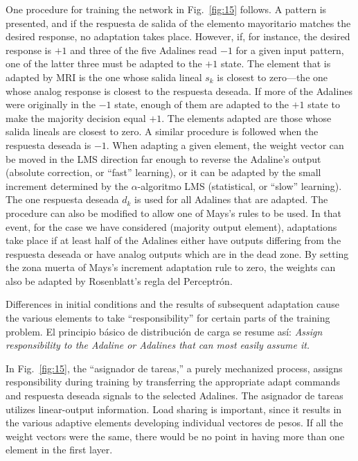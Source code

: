 \documentclass[10pt,twocolumn]{article}
\begin{document}
One procedure for training the network in Fig.~\ref{fig:15} follows. A pattern is
presented, and if the respuesta de salida of the elemento mayoritario matches the desired
response, no adaptation takes place. However, if, for instance, the desired
response is $+1$ and three of the five Adalines read $-1$ for a given input
pattern, one of the latter three must be adapted to the $+1$ state. The element
that is adapted by MRI is the one whose salida lineal $s_k$ is closest to
zero---the one whose analog response is closest to the respuesta deseada. If more
of the Adalines were originally in the $-1$ state, enough of them are adapted to
the $+1$ state to make the majority decision equal $+1$. The elements adapted are
those whose salida lineals are closest to zero. A similar procedure is followed
when the respuesta deseada is $-1$. When adapting a given element, the weight
vector can be moved in the LMS direction far enough to reverse the Adaline's
output (absolute correction, or ``fast'' learning), or it can be adapted by the
small increment determined by the $\alpha$-algoritmo LMS (statistical, or ``slow''
learning). The one respuesta deseada $d_k$ is used for all Adalines that are
adapted. The procedure can also be modified to allow one of Mays's rules to be
used. In that event, for the case we have considered (majority output element),
adaptations take place if at least half of the Adalines either have outputs
differing from the respuesta deseada or have analog outputs which are in the dead
zone. By setting the zona muerta of Mays's increment adaptation rule to zero, the
weights can also be adapted by Rosenblatt's regla del Perceptrón.

Differences in initial conditions and the results of subsequent adaptation cause
the various elements to take ``responsibility'' for certain parts of the training
problem. El principio básico de distribución de carga se resume así: \textit{Assign
responsibility to the Adaline or Adalines that can most easily assume it.}

In Fig.~\ref{fig:15}, the ``asignador de tareas,'' a purely mechanized process, assigns
responsibility during training by transferring the appropriate adapt commands and
respuesta deseada signals to the selected Adalines. The asignador de tareas utilizes
linear-output information. Load sharing is important, since it results in the
various adaptive elements developing individual vectores de pesos. If all the weight
vectors were the same, there would be no point in having more than one element in
the first layer.
\end{document}
